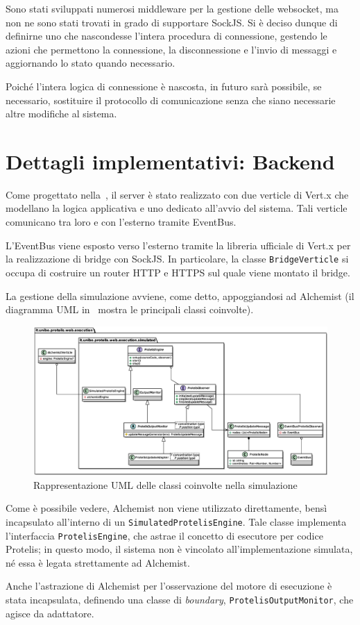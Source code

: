     Sono stati sviluppati numerosi middleware per la gestione delle websocket, ma non ne sono stati trovati in grado di supportare SockJS\@.
    Si è deciso dunque di definirne uno che nascondesse l'intera procedura di connessione, gestendo le azioni che permettono la connessione, la disconnessione e l'invio di messaggi e aggiornando lo stato quando necessario.

    Poiché l'intera logica di connessione è nascosta, in futuro sarà possibile, se necessario, sostituire il protocollo di comunicazione senza che siano necessarie altre modifiche al sistema.

  \section{Dettagli implementativi: Backend}

    Come progettato nella~, il server è stato realizzato con due verticle di Vert.x che modellano la logica applicativa e uno dedicato all'avvio del sistema.
    Tali verticle comunicano tra loro e con l'esterno tramite EventBus.

    L'EventBus viene esposto verso l'esterno tramite la libreria ufficiale di Vert.x per la realizzazione di bridge con SockJS\@.
    In particolare, la classe \texttt{BridgeVerticle} si occupa di costruire un router HTTP e HTTPS sul quale viene montato il bridge.

    La gestione della simulazione avviene, come detto, appoggiandosi ad Alchemist (il diagramma UML in~ mostra le principali classi coinvolte).

    \begin{figure}[htbp]
      \centering
      \includegraphics[width=\textwidth]{res/uml/engine-simple.eps}
      \caption{Rappresentazione UML delle classi coinvolte nella simulazione}%
      \label{fig:server:uml}
    \end{figure}

    Come è possibile vedere, Alchemist non viene utilizzato direttamente, bensì incapsulato all'interno di un \texttt{SimulatedProtelisEngine}.
    Tale classe implementa l'interfaccia \texttt{ProtelisEngine}, che astrae il concetto di esecutore per codice Protelis;
    in questo modo, il sistema non è vincolato all'implementazione simulata, né essa è legata strettamente ad Alchemist.

    Anche l'astrazione di Alchemist per l'osservazione del motore di esecuzione è stata incapsulata, definendo una classe di \emph{boundary}, \texttt{ProtelisOutputMonitor}, che agisce da adattatore.
